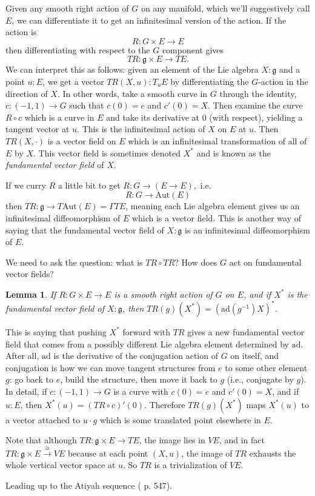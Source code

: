 \documentclass[12pt]{article}
\newcommand{\Aut}{\mathrm{Aut}}
\newcommand{\ad}{\mathrm{ad}}
\newtheorem{mylemma}{Lemma}
\begin{document}
Given any smooth right action of $G$ on any manifold, which we'll suggestively call $E$, we can differentiate it to get an infinitesimal version of the action. If the action is $$R:G\times E \to E$$ then differentiating with respect to the $G$ component gives $$TR:\mathfrak{g}\times E \to TE.$$ We can interpret this as follows: given an element of the Lie algebra $X:\mathfrak{g}$ and a point $u:E$, we get a vector $TR(X, u):T_u E$ by differentiating the $G$-action in the direction of $X$. In other words, take a smooth curve in $G$ through the identity, $c:(-1, 1)\to G$ such that $c(0)=e$ and $c'(0)=X$. Then examine the curve $R\circ c$ which is a curve in $E$ and take its derivative at 0 (with respect), yielding a tangent vector at $u$. This is the infinitesimal action of $X$ on $E$ at $u$. Then $TR(X, \cdot)$ is a vector field on $E$ which is an infinitesimal transformation of all of $E$ by $X$. This vector field is sometimes denoted $X^*$ and is known as the \emph{fundamental vector field} of $X$.

If we curry $R$ a little bit to get $R:G\to (E \to E),$ i.e. $$R:G\to \Aut(E)$$ then $TR:\mathfrak{g}\to T\Aut(E)=\Gamma TE$, meaning each Lie algebra element gives us an infinitesimal diffeomorphism of $E$ which is a vector field. This is another way of saying that the fundamental vector field of $X:\mathfrak{g}$ is an infinitesimal diffeomorphism of $E$.

We need to ask the question: what is $TR\circ TR$? How does $G$ act on fundamental vector fields? 
\begin{mylemma}
If $R:G\times E \to E$ is a smooth right action of $G$ on $E$, and if $X^*$ is the fundamental vector field of $X:\mathfrak{g}$, then $TR(g)(X^*)=(\ad(g^{-1})X)^*$.
\end{mylemma}
This is saying that pushing $X^*$ forward with $TR$ gives a new fundamental vector field that comes from a possibly different Lie algebra element determined by $\ad$. After all, $\ad$ is the derivative of the conjugation action of $G$ on itself, and conjugation is how we can move tangent structures from $e$ to some other element $g$: go back to $e$, build the structure, then move it back to $g$ (i.e., conjugate by $g$). In detail, if $c:(-1,1)\to G$ is a curve with $c(0)=e$ and $c'(0)=X$, and if $u:E$, then $X^*(u)=(TR\circ c)'(0)$. Therefore $TR(g)(X^*)$ maps $X^*(u)$ to a vector attached to $u\cdot g$ which is some translated point elsewhere in $E$. 

Note that although $TR:\mathfrak{g}\times E\to TE$, the image lies in $VE$, and in fact $TR:\mathfrak{g}\times E \xrightarrow{\cong} VE$ because at each point $(X, u)$, the image of $TR$ exhausts the whole vertical vector space at $u$. So $TR$ is a trivialization of $VE$.

Leading up to the Atiyah sequence (\cite{atiyah1983yang} p. 547).


\end{document}
